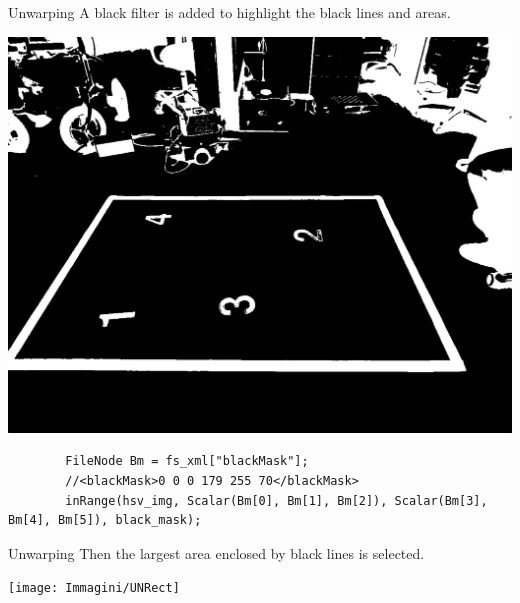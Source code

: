 \begin{frame}[fragile]{Unwarping}
	A black filter is added to highlight the black lines and areas.
	\begin{center}
		\includegraphics[scale=0.15]{Immagini/UNBlackFilter}
	\end{center}
	\vfill	
	\begin{verbatim}
		FileNode Bm = fs_xml["blackMask"]; 
		//<blackMask>0 0 0 179 255 70</blackMask>
        inRange(hsv_img, Scalar(Bm[0], Bm[1], Bm[2]), Scalar(Bm[3], Bm[4], Bm[5]), black_mask);
	\end{verbatim}
	\vfill
\end{frame}

\begin{frame}[fragile]{Unwarping}
	Then the largest area enclosed by black lines is selected. 
	\begin{center}
		\texttt{[image: Immagini/UNRect]}
	\end{center}
\end{frame}

